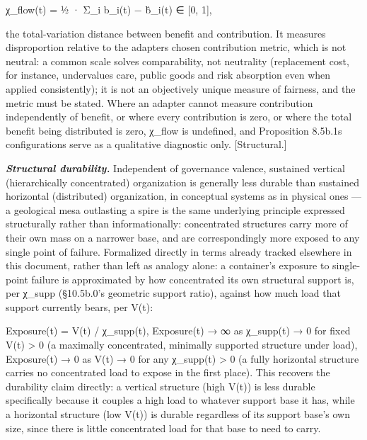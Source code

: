 \documentclass[
]{article}
\begin{document}
χ\_flow(t) = ½ · Σ\_i \textbar{} b\_i(t) − b̂\_i(t) \textbar{} ∈ {[}0,
1{]},

the total-variation distance between benefit and contribution. It
measures disproportion relative to the adapter\textquotesingle s chosen
contribution metric, which is not neutral: a common scale solves
comparability, not neutrality (replacement cost, for instance,
undervalues care, public goods and risk absorption even when applied
consistently); it is not an objectively unique measure of fairness, and
the metric must be stated. Where an adapter cannot measure contribution
independently of benefit, or where every contribution is zero, or where
the total benefit being distributed is zero, χ\_flow is undefined, and
Proposition 8.5b.1\textquotesingle s configurations serve as a
qualitative diagnostic only. {[}Structural.{]}

\emph{\textbf{Structural durability.}} Independent of governance
valence, sustained vertical (hierarchically concentrated) organization
is generally less durable than sustained horizontal (distributed)
organization, in conceptual systems as in physical ones --- a geological
mesa outlasting a spire is the same underlying principle expressed
structurally rather than informationally: concentrated structures carry
more of their own mass on a narrower base, and are correspondingly more
exposed to any single point of failure. Formalized directly in terms
already tracked elsewhere in this document, rather than left as analogy
alone: a container's exposure to single-point failure is approximated by
how concentrated its own structural support is, per χ\_supp (§10.5b.0's
geometric support ratio), against how much load that support currently
bears, per V(t):

Exposure(t) = V(t) / χ\_supp(t), Exposure(t) → ∞ as χ\_supp(t) → 0 for
fixed V(t) \textgreater{} 0 (a maximally concentrated, minimally
supported structure under load), Exposure(t) → 0 as V(t) → 0 for any
χ\_supp(t) \textgreater{} 0 (a fully horizontal structure carries no
concentrated load to expose in the first place). This recovers the
durability claim directly: a vertical structure (high V(t)) is less
durable specifically because it couples a high load to whatever support
base it has, while a horizontal structure (low V(t)) is durable
regardless of its support base's own size, since there is little
concentrated load for that base to need to carry.
\end{document}
